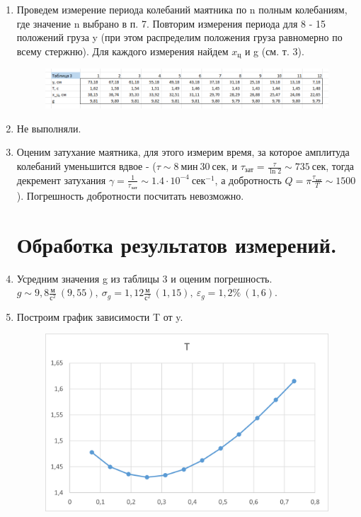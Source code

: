 \documentclass[a4paper,12pt]{article} %
\begin{document}
\begin{enumerate}
\item Проведем измерение периода колебаний маятника по n полным колебаниям, где значение n выбрано в п. 7. Повторим измерения периода для 8 - 15 положений груза y (при этом распределим положения груза равномерно по всему стержню). Для каждого измерения найдем $x_{\text{ц}}$ и g (см. т. 3).

\begin{figure} [H]
	\center
	\includegraphics[scale = 0.7]{data/таблица 3.png}
\end{figure}

\item Не выполняли.

\item Оценим затухание маятника, для этого измерим время, за которое амплитуда колебаний уменьшится вдвое - ($\tau \sim 8\ \text{мин}\ 30\ \text{сек}$, и $\tau_{\text{зат}} = \frac{\tau}{\ln{2}} \sim 735\ \text{сек}$, тогда декремент затухания $\gamma = \frac{1}{\tau_{\text{зат}}} \sim 1.4 \cdot 10^{-4}\ \text{сек}^{-1}$, а добротность $Q = \pi \frac{\tau_{\text{зат}}}{T} \sim 1500$). Погрешность добротности посчитать невозможно.

\section{Обработка результатов измерений.}

\item Усредним значения g из таблицы 3 и оценим погрешность.
$g \sim 9,8 \frac{\text{м}}{\text{с}^2}\ (9,55),\ \sigma_g = 1,12 \frac{\text{м}}{\text{с}^2}\ (1,15),\ \varepsilon_g = 1,2\%\ (1,6)$.

\item Построим график зависимости T от y.

\begin{figure} [H]
	\center
	\includegraphics[scale = 0.8]{data/T(y).png}
\end{figure}


\end{enumerate}
\end{document}
